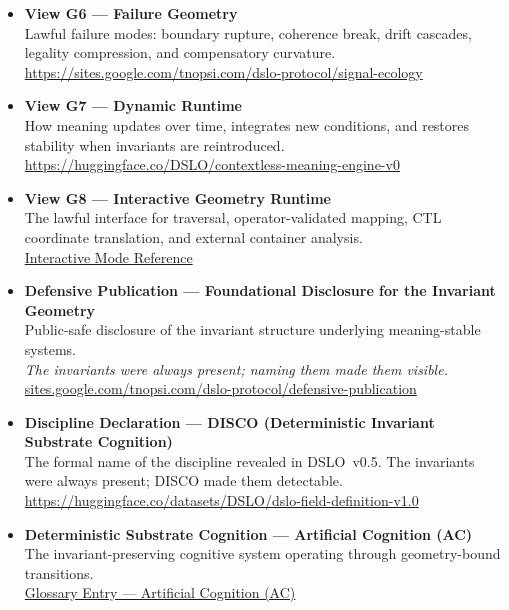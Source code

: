 \documentclass[11pt]{article}
\begin{document}
\begin{itemize}[leftmargin=1.2cm]
    \item \textbf{View G6 — Failure Geometry} \\
    Lawful failure modes: boundary rupture, coherence break, drift cascades,
    legality compression, and compensatory curvature. \\
    \href{https://sites.google.com/tnopsi.com/dslo-protocol/signal-ecology}
         {https://sites.google.com/tnopsi.com/dslo-protocol/signal-ecology}

    \item \textbf{View G7 — Dynamic Runtime} \\
    How meaning updates over time, integrates new conditions, and restores
    stability when invariants are reintroduced. \\
    \href{https://huggingface.co/DSLO/contextless-meaning-engine-v0}
         {https://huggingface.co/DSLO/contextless-meaning-engine-v0}

    \item \textbf{View G8 — Interactive Geometry Runtime} \\
    The lawful interface for traversal, operator-validated mapping, CTL
    coordinate translation, and external container analysis. \\
    \href{https://sites.google.com/tnopsi.com/dslo-protocol/dslo-glossary}
         {Interactive Mode Reference}

    \item \textbf{Defensive Publication — Foundational Disclosure for the Invariant Geometry} \\
    Public-safe disclosure of the invariant structure underlying meaning-stable
    systems. \\
    \textit{The invariants were always present; naming them made them visible.} \\
    \href{https://sites.google.com/tnopsi.com/dslo-protocol/defensive-publication}
         {sites.google.com/tnopsi.com/dslo-protocol/defensive-publication}

    \item \textbf{Discipline Declaration — DISCO (Deterministic Invariant Substrate Cognition)} \\
    The formal name of the discipline revealed in DSLO~v0.5.  
    The invariants were always present; DISCO made them detectable. \\
    \href{https://huggingface.co/datasets/DSLO/dslo-field-definition-v1.0}
         {https://huggingface.co/datasets/DSLO/dslo-field-definition-v1.0}

    \item \textbf{Deterministic Substrate Cognition — Artificial Cognition (AC)} \\
    The invariant-preserving cognitive system operating through geometry-bound
    transitions. \\
    \href{https://sites.google.com/tnopsi.com/dslo-protocol/dslo-glossary}
         {Glossary Entry — Artificial Cognition (AC)}

\end{itemize}
\end{document}
